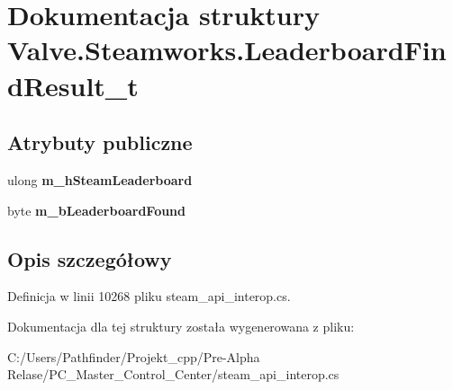 \hypertarget{struct_valve_1_1_steamworks_1_1_leaderboard_find_result__t}{}\section{Dokumentacja struktury Valve.\+Steamworks.\+Leaderboard\+Find\+Result\+\_\+t}
\label{struct_valve_1_1_steamworks_1_1_leaderboard_find_result__t}
\subsection*{Atrybuty publiczne}
\begin{DoxyCompactItemize}
\item 
\mbox{\label{struct_valve_1_1_steamworks_1_1_leaderboard_find_result__t_a46050c972bab2762d1537e77168feceb}} 
ulong {\bfseries m\+\_\+h\+Steam\+Leaderboard}
\item 
\mbox{\label{struct_valve_1_1_steamworks_1_1_leaderboard_find_result__t_ae075c172dd3a0ee48f7b843f96818ac2}} 
byte {\bfseries m\+\_\+b\+Leaderboard\+Found}
\end{DoxyCompactItemize}


\subsection{Opis szczegółowy}


Definicja w linii 10268 pliku steam\+\_\+api\+\_\+interop.\+cs.



Dokumentacja dla tej struktury została wygenerowana z pliku\+:\begin{DoxyCompactItemize}
\item 
C\+:/\+Users/\+Pathfinder/\+Projekt\+\_\+cpp/\+Pre-\/\+Alpha Relase/\+P\+C\+\_\+\+Master\+\_\+\+Control\+\_\+\+Center/steam\+\_\+api\+\_\+interop.\+cs\end{DoxyCompactItemize}
